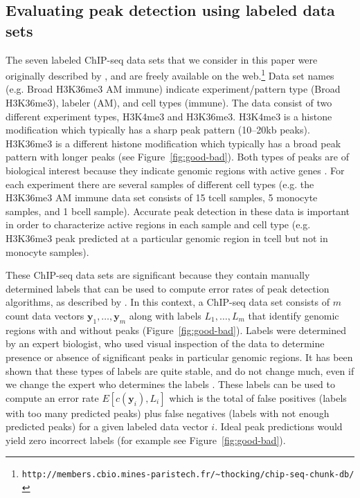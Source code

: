 \documentclass[twoside,11pt]{article}
\begin{document}
\subsection{Evaluating peak detection using labeled data sets}

The seven labeled ChIP-seq data sets that we consider in this paper were originally
described by \citet{HOCKING2016-chipseq}, and are freely available on
the
web.\footnote{\verb|http://members.cbio.mines-paristech.fr/~thocking/chip-seq-chunk-db/|}
Data set names (e.g. Broad H3K36me3 AM immune) indicate
experiment/pattern type (Broad H3K36me3), labeler (AM), and cell types
(immune). The data consist of two different experiment types, H3K4me3
and H3K36me3. H3K4me3 is a histone modification which typically has a
sharp peak pattern (10--20kb peaks). H3K36me3 is a different histone
modification which typically has a broad peak pattern with longer
peaks (see Figure~\ref{fig:good-bad}). Both types of peaks are of
biological interest because they indicate genomic regions with active
genes \citep{histone-review}. For each experiment there are several samples of different
cell types (e.g. the H3K36me3 AM immune data set consists of 15 tcell
samples, 5 monocyte samples, and 1 bcell sample). Accurate peak
detection in these data is important in order to characterize active
regions in each sample and cell type (e.g. H3K36me3 peak predicted at
a particular genomic region in tcell but not in monocyte samples).

These ChIP-seq data sets are significant because they contain manually
determined labels that can be used to compute error rates of peak
detection algorithms, as described by \citet{HOCKING2016-chipseq}. In
this context, a ChIP-seq data set consists of $m$ count data vectors
$\mathbf y_1,\dots,\mathbf y_m$ along with labels $L_1,\dots, L_m$
that identify genomic regions with and without peaks
(Figure~\ref{fig:good-bad}). Labels were determined by an expert
biologist, who used visual inspection of the data to determine
presence or absence of significant peaks in particular genomic
regions. It has been shown that these types of labels are quite
stable, and do not change much, even if we change the expert who
determines the labels \citep{HOCKING2016-chipseq}. These labels can
be used to compute an error rate $E[c(\mathbf y_i), L_i]$ which is the
total of false positives (labels with too many predicted peaks) plus
false negatives (labels with not enough predicted peaks) for a given
labeled data vector $i$. Ideal peak predictions would yield zero
incorrect labels (for example see Figure~\ref{fig:good-bad}).
\end{document}
